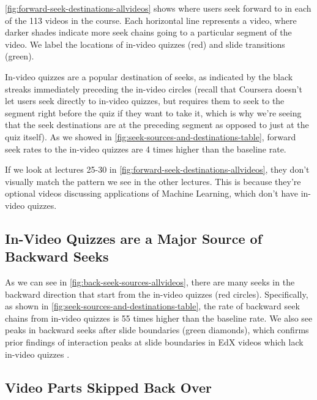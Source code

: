 \documentclass{sigchi}
\begin{document}
\autoref{fig:forward-seek-destinations-allvideos} shows where users seek forward to in each of the 113 videos in the course. Each horizontal line represents a video, where darker shades indicate more seek chains going to a particular segment of the video. We label the locations of in-video quizzes (red) and slide transitions (green). %

In-video quizzes are a popular destination of seeks, as indicated by the black streaks immediately preceding the in-video circles (recall that Coursera doesn't let users seek directly to in-video quizzes, but requires them to seek to the segment right before the quiz if they want to take it, which is why we're seeing that the seek destinations are at the preceding segment as opposed to just at the quiz itself). As we showed in \autoref{fig:seek-sources-and-destinations-table}, forward seek rates to the in-video quizzes are 4 times higher than the baseline rate.

If we look at lectures 25-30 in \autoref{fig:forward-seek-destinations-allvideos}, they don't visually match the pattern we see in the other lectures. This is because they're optional videos discussing applications of Machine Learning, which don't have in-video quizzes. %


\subsection{In-Video Quizzes are a Major Source of Backward Seeks}

As we can see in \autoref{fig:back-seek-sources-allvideos}, there are many seeks in the backward direction that start from the in-video quizzes (red circles). Specifically, as shown in \autoref{fig:seek-sources-and-destinations-table}, the rate of backward seek chains from in-video quizzes is 55 times higher than the baseline rate. We also see peaks in backward seeks after slide boundaries (green diamonds), which confirms prior findings of interaction peaks at slide boundaries in EdX videos which lack in-video quizzes \cite{juho}.

\subsection{Video Parts Skipped Back Over}
\end{document}

